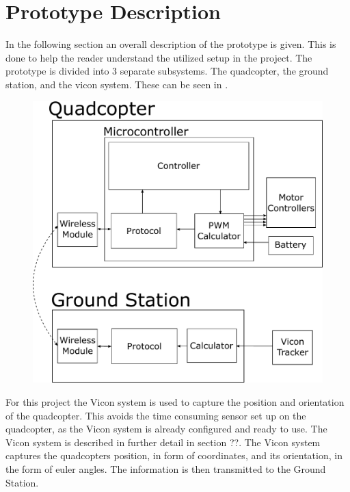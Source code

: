 \section{Prototype Description}
In the following section an overall description of the prototype is given. This is done to help the reader understand the utilized setup in the project.
The prototype is divided into 3 separate subsystems. The quadcopter, the ground station, and the vicon system. These can be seen in . 

\begin{figure}[H] 
	\includegraphics[scale=.5]{figures/prototypediagram}
	\centering
	\captionsetup{justification=centering}
	\label{prototypediagram}
\end{figure}


For this project the Vicon system is used to capture the position and orientation of the quadcopter. This avoids the time consuming sensor set up on the quadcopter, as the Vicon system is already configured and ready to use. The Vicon system is described in further detail in section ??. The Vicon system captures the quadcopters position, in form of coordinates, and its orientation, in the form of euler angles. The information is then transmitted to the Ground Station.

